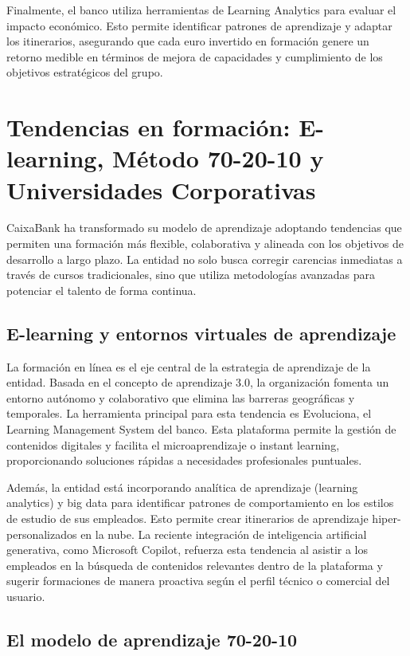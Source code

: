 Finalmente, el banco utiliza herramientas de Learning Analytics para evaluar el impacto económico. Esto permite identificar patrones de aprendizaje y adaptar los itinerarios, asegurando que cada euro invertido en formación genere un retorno medible en términos de mejora de capacidades y cumplimiento de los objetivos estratégicos del grupo.

\section{Tendencias en formación: E-learning, Método 70-20-10 y Universidades Corporativas}

CaixaBank ha transformado su modelo de aprendizaje adoptando tendencias que permiten una formación más flexible, colaborativa y alineada con los objetivos de desarrollo a largo plazo. La entidad no solo busca corregir carencias inmediatas a través de cursos tradicionales, sino que utiliza metodologías avanzadas para potenciar el talento de forma continua.

\subsection{E-learning y entornos virtuales de aprendizaje}

La formación en línea es el eje central de la estrategia de aprendizaje de la entidad. Basada en el concepto de aprendizaje 3.0, la organización fomenta un entorno autónomo y colaborativo que elimina las barreras geográficas y temporales. La herramienta principal para esta tendencia es Evoluciona, el Learning Management System del banco. Esta plataforma permite la gestión de contenidos digitales y facilita el microaprendizaje o instant learning, proporcionando soluciones rápidas a necesidades profesionales puntuales.

Además, la entidad está incorporando analítica de aprendizaje (learning analytics) y big data para identificar patrones de comportamiento en los estilos de estudio de sus empleados. Esto permite crear itinerarios de aprendizaje hiper-personalizados en la nube. La reciente integración de inteligencia artificial generativa, como Microsoft Copilot, refuerza esta tendencia al asistir a los empleados en la búsqueda de contenidos relevantes dentro de la plataforma y sugerir formaciones de manera proactiva según el perfil técnico o comercial del usuario.

\subsection{El modelo de aprendizaje 70-20-10}

